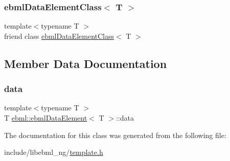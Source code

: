 \subsubsection{\texorpdfstring{ebml\+Data\+Element\+Class$<$ T $>$}{ebmlDataElementClass< T >}}
{\footnotesize\ttfamily template$<$typename T $>$ \\
friend class \mbox{\hyperlink{classebml_1_1ebmlDataElementClass}{ebml\+Data\+Element\+Class}}$<$ T $>$\hspace{0.3cm}{\ttfamily [friend]}}



\subsection{Member Data Documentation}
\mbox{\label{classebml_1_1ebmlDataElement_aa0b68d39cf69e0a34ba7bb1d8368a386}} 
\subsubsection{\texorpdfstring{data}{data}}
{\footnotesize\ttfamily template$<$typename T $>$ \\
T \mbox{\hyperlink{classebml_1_1ebmlDataElement}{ebml\+::ebml\+Data\+Element}}$<$ T $>$\+::data}



The documentation for this class was generated from the following file\+:\begin{DoxyCompactItemize}
\item 
include/libebml\+\_\+ng/\mbox{\hyperlink{template_8h}{template.\+h}}\end{DoxyCompactItemize}
